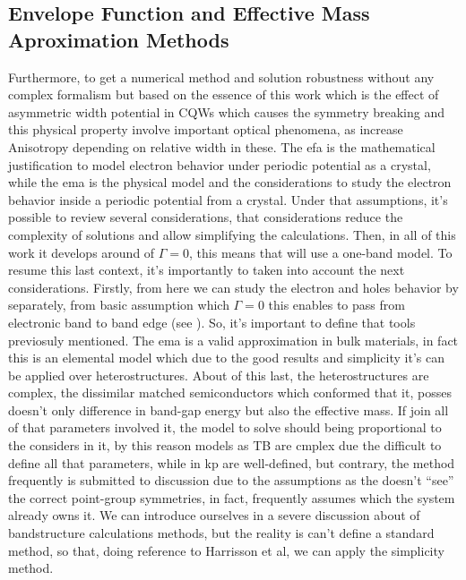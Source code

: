 \subsection{Envelope Function and Effective Mass Aproximation Methods}
\label{subsec:chapter-2-efa-and-ema}
\vspace{-10mm} 
Furthermore, to get a numerical method and solution robustness without any complex formalism but based on the essence of this work which is the effect of asymmetric width potential in CQWs which causes the symmetry breaking and this physical property involve important optical phenomena, as increase Anisotropy depending on relative width in these.
The \gls{efa} is the mathematical justification to model electron behavior under periodic potential as a crystal, while the \gls{ema} is the physical model and the considerations to study the electron behavior inside a periodic potential from a crystal\cite{harrison2016quantum}.
Under that assumptions, it's possible to review several considerations, that considerations reduce the complexity of solutions and allow simplifying the calculations. Then, in all of this work  it develops around of  $\Gamma=0$, this means that will use a one-band model. To resume this last context, it's importantly to taken into account the next considerations. Firstly, from here we can study the electron and holes behavior by separately, from basic assumption which $\Gamma=0$ this enables to pass from electronic band to band edge (see ). So, it's important to define that tools previosuly mentioned. The \gls{ema} is a valid approximation in bulk materials, in fact this is an elemental model which  due to the good results and simplicity it's can be applied over heterostructures.  About of this last, the heterostructures are complex, the dissimilar matched semiconductors which conformed that it, posses doesn't only difference in band-gap energy but also the effective mass.  
If join all of that parameters involved it, the model to solve should being proportional to the considers in it, by this reason models as \gls{TB} are cmplex due the difficult to define all that parameters, while in \gls{kp} are well-defined, but contrary, the method frequently is  submitted to discussion due to the assumptions as the doesn't ``see'' the correct point-group symmetries, in fact, frequently assumes which the system already owns it.  We can introduce ourselves in a severe discussion about of bandstructure calculations methods, but the reality is can't define a standard method, so that, doing reference to Harrisson et al\cite{harrison2016quantum}, we can apply the simplicity method.


